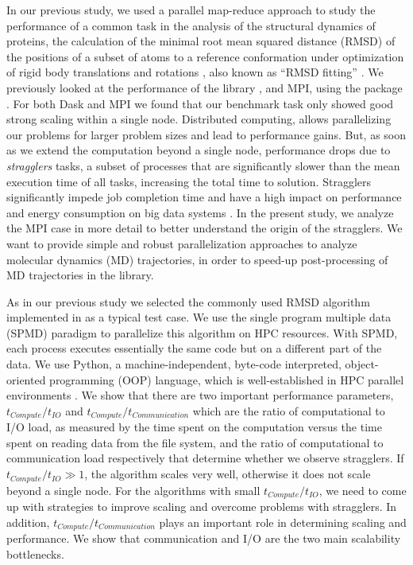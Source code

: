 In our previous study, we used a parallel map-reduce approach to study the performance of a common task in the analysis of the structural dynamics of proteins, the calculation of the minimal root mean squared distance (RMSD) of the positions of a subset of atoms to a reference conformation under optimization of rigid body translations and rotations \cite{Khoshlessan:2017ab, ICCP-2018}, also known as ``RMSD fitting'' \cite{Liu:2010kx, Mura:2014kx}. 
We previously looked at the performance of the  library \cite{Rocklin:2015aa}, and MPI, using the  package \cite{Dalcin:2011aa, Dalcin:2005aa}. 
For both Dask and MPI we found that our benchmark task only showed good strong scaling within a single node.
Distributed computing, allows parallelizing our problems for larger problem sizes and lead to performance gains.
But, as soon as we extend the computation beyond a single node, performance drops due to \emph{stragglers} tasks, a subset of processes that are significantly slower than the mean execution time of all tasks, increasing the total time to solution.
Stragglers significantly impede job completion time \cite{Garraghan2016} and have a high impact on performance and energy consumption on big data systems \cite{Tien-2017}.
In the present study, we analyze the MPI case in more detail to better understand the origin of the stragglers.
We want to provide simple and robust parallelization approaches to analyze molecular dynamics (MD) trajectories, in order to speed-up post-processing of MD trajectories in the  library. 

As in our previous study we selected the commonly used RMSD algorithm implemented in  as a typical test case.
We use the single program multiple data (SPMD) paradigm to parallelize this algorithm on HPC resources.
With SPMD, each process executes essentially the same code but on a different part of the data. 
We use Python, a machine-independent, byte-code interpreted, object-oriented programming (OOP) language, which is well-established in HPC parallel environments \cite{GAiN}. 
We show that there are two important performance parameters, $t_{Compute}/t_{IO}$ and $t_{Compute}/t_{Communication}$ which are the ratio of computational to I/O load, as measured by the time spent on the computation versus the time spent on reading data from the file system, and the ratio of computational to communication load respectively that determine whether we observe stragglers.
If $t_{Compute}/t_{IO} \gg 1$, the algorithm scales very well, otherwise it does not scale beyond a single node.  
For the algorithms with small $t_{Compute}/t_{IO}$, we need to come up with strategies to improve scaling and overcome problems with stragglers.
In addition, $t_{Compute}/t_{Communication}$ plays an important role in determining scaling and performance.
We show that communication and I/O are the two main scalability bottlenecks.

